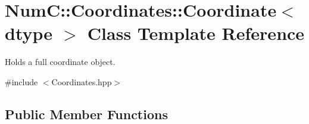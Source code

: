 \hypertarget{class_num_c_1_1_coordinates_1_1_coordinate}{}\section{NumC\+:\+:Coordinates\+:\+:Coordinate$<$ dtype $>$ Class Template Reference}
\label{class_num_c_1_1_coordinates_1_1_coordinate}


Holds a full coordinate object.  




{\ttfamily \#include $<$Coordinates.\+hpp$>$}

\subsection*{Public Member Functions}
